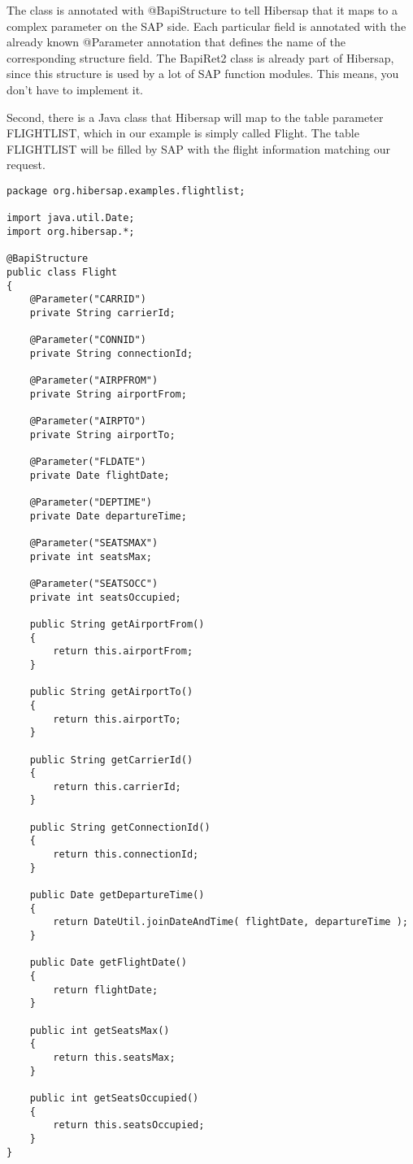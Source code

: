 The class is annotated with @BapiStructure to tell Hibersap that it maps to
a complex parameter on the SAP side. Each particular field is annotated with the
already known @Parameter annotation that defines the name of the corresponding structure field.
The BapiRet2 class is already part of Hibersap, since this structure is used by a lot of
SAP function modules. This means, you don't have to implement it.

Second, there is a Java class that Hibersap will map to the table parameter FLIGHTLIST,
which in our example is simply called Flight.
The table FLIGHTLIST will be filled by SAP with the flight information matching our request.

\begin{Verbatim}[frame=single,label=The Flight class]
package org.hibersap.examples.flightlist;

import java.util.Date;
import org.hibersap.*;

@BapiStructure
public class Flight
{
    @Parameter("CARRID")
    private String carrierId;

    @Parameter("CONNID")
    private String connectionId;

    @Parameter("AIRPFROM")
    private String airportFrom;

    @Parameter("AIRPTO")
    private String airportTo;

    @Parameter("FLDATE")
    private Date flightDate;

    @Parameter("DEPTIME")
    private Date departureTime;

    @Parameter("SEATSMAX")
    private int seatsMax;

    @Parameter("SEATSOCC")
    private int seatsOccupied;

    public String getAirportFrom()
    {
        return this.airportFrom;
    }

    public String getAirportTo()
    {
        return this.airportTo;
    }

    public String getCarrierId()
    {
        return this.carrierId;
    }

    public String getConnectionId()
    {
        return this.connectionId;
    }

    public Date getDepartureTime()
    {
        return DateUtil.joinDateAndTime( flightDate, departureTime );
    }

    public Date getFlightDate()
    {
        return flightDate;
    }

    public int getSeatsMax()
    {
        return this.seatsMax;
    }

    public int getSeatsOccupied()
    {
        return this.seatsOccupied;
    }
}
\end{Verbatim}

